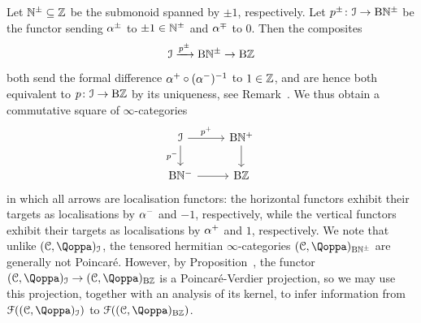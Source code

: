 Let $\mathbb{N}^{\pm} \subseteq \mathbb{Z}$ be the submonoid spanned by $\pm 1$, respectively. Let $p^{\pm}\colon \mathcal{I} \to \mathrm{B}\mathbb{N}^{\pm}$ be the functor sending $\alpha^{\pm}$ to $\pm 1 \in \mathbb{N}^{\pm}$ and $\alpha^{\mp}$ to $0$. Then the composites 
\[
\mathcal{I} \xrightarrow{p^{\pm}} \mathrm{B}\mathbb{N}^{\pm} \to \mathrm{B}\mathbb{Z}
\]
both send the formal difference $\alpha^+ \circ (\alpha^-)^{-1}$ to $1 \in \mathbb{Z}$, and are hence both equivalent to $p\colon \mathcal{I} \to \mathrm{B}\mathbb{Z}$ by its uniqueness, see Remark~. %
We thus obtain a commutative square of $\infty$-categories
\[
\begin{tikzcd}
\I \ar[r, "p^+"]\ar[d, "p^-"'] & \B \NN^+ \ar[d] \\
\B\NN^- \ar[r] & \B\ZZ
\end{tikzcd}
\]
in which all arrows are localisation functors: the horizontal functors exhibit their targets as localisations by $\alpha^-$ and $-1$, respectively, while the vertical functors exhibit their targets as localisations by $\alpha^+$ and $1$, respectively. We note that unlike $(\C,\QF)_\I$, the tensored hermitian $\infty$-categories $(\C,\QF)_{\B\NN^{\pm}}$ are generally not Poincaré. However, by Proposition~\;, the functor $(\C,\QF)_\I \to (\C,\QF)_{\B\ZZ}$ is a Poincar\'e-Verdier projection, so we may use this projection, together with an analysis of its kernel, to infer information from $\F((\C,\QF)_\I)$ to $\F((\C,\QF)_{\B\ZZ})$.











